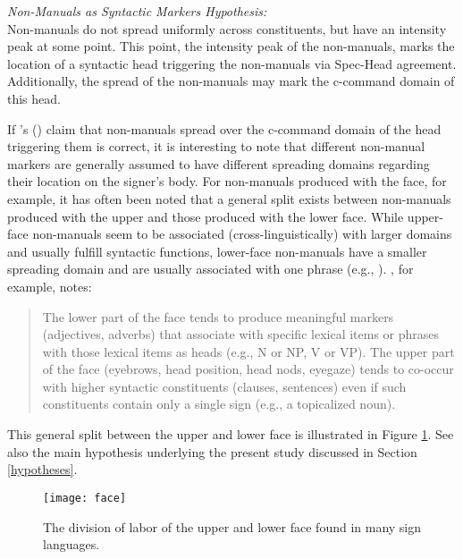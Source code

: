 \begin{exe}
\ex \textit{Non-Manuals as Syntactic Markers Hypothesis:}\\
Non-manuals do not spread uniformly across constituents, but have an intensity peak at some point. This point, the intensity peak of the non-manuals, marks the location of a syntactic head triggering the non-manuals via Spec-Head agreement. Additionally, the spread of the non-manuals may mark the c-command domain of this head. \label{nmasmh}
\end{exe}

\noindent If \citeauthor{neidle2000syntax}'s (\citeyear{neidle2000syntax}) claim that non-manuals spread over the c-command domain of the head triggering them is correct, it is interesting to note that different non-manual markers are generally assumed to have different spreading domains regarding their location on the signer's body. For non-manuals produced with the face, for example, it has often been noted that a general split exists between non-manuals produced with the upper and those produced with the lower face. While upper-face non-manuals seem to be associated (cross-linguistically) with larger domains and usually fulfill syntactic functions, lower-face non-manuals have a smaller spreading domain and are usually associated with one phrase (e.g., \citealt{liddell1980american, coerts1992nonmanual, wilbur2000phonological, wilbur2003modality, brentari2002prosody}). \citet[249]{wilbur2009productive}, for example, notes: 


\begin{quote}
The lower part\label{wilburquote} of the face tends to produce meaningful markers (adjectives, adverbs) that associate with specific lexical items or phrases with those lexical items as heads (e.g., N or NP, V or VP). The upper part of the face (eyebrows, head position, head nods, eyegaze) tends to co-occur with higher syntactic constituents (clauses, sentences) even if such constituents contain only a single sign (e.g., a topicalized noun). 
\end{quote}

\noindent This general split between the upper and lower face is illustrated in Figure \ref{upperlowerfacedivisionoflabour}. See also the main hypothesis underlying the present study discussed in Section \ref{hypotheses}.

\begin{figure}
\centering
	\texttt{[image: face]}
	\caption{The division of labor of the upper and lower face found in many sign languages.}
	\label{upperlowerfacedivisionoflabour}
\end{figure}


